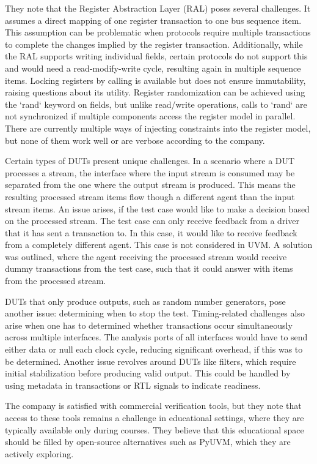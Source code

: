 They note that the Register Abstraction Layer (RAL) poses several challenges. It assumes a direct mapping of one
register transaction to one bus sequence item. This assumption can be problematic when protocols require multiple
transactions to complete the changes implied by the register transaction. Additionally, while the RAL supports
writing individual fields, certain protocols do not support this and would need a read-modify-write cycle, resulting
again in multiple sequence items. Locking registers by calling  is available but does not ensure
immutability, raising questions
about its utility. Register randomization can be achieved using the `rand` keyword on fields, but unlike read/write
operations, calls to `rand` are not synchronized if multiple components access the register model in parallel. There
are currently multiple ways of injecting constraints into the register model, but none of them work well or are
verbose according to the company.

Certain types of DUTs present unique challenges. In a scenario where a DUT processes a stream, the interface where
the input stream is consumed may be separated from the one where the output stream is produced. This means the
resulting processed stream items flow though a different agent than the input stream items. An issue arises, if the
test case would like to make a decision based on the processed stream. The test case can only receive feedback from a
driver that it has sent a transaction to. In this case, it would like to receive feedback from a completely different
agent. This case is not considered in UVM. A solution was outlined, where the agent receiving the processed stream
would receive dummy transactions from the test case, such that it could answer with items from the processed stream.

DUTs that only produce outputs, such as random number generators, pose another issue: determining when to stop the
test. Timing-related challenges also arise when one has to determined whether transactions occur simultaneously
across multiple interfaces. The analysis ports of all interfaces would have to send either data or null each clock
cycle, reducing significant overhead, if this was to be determined. Another issue revolves around DUTs like filters,
which require initial stabilization before producing valid output. This could be handled by using metadata in
transactions or RTL signals to indicate readiness.

The company is satisfied with commercial verification tools, but they note that access to these tools remains a
challenge in educational settings, where they are typically available only during courses. They believe that this
educational space should be filled by open-source alternatives such as PyUVM, which they are actively exploring.

